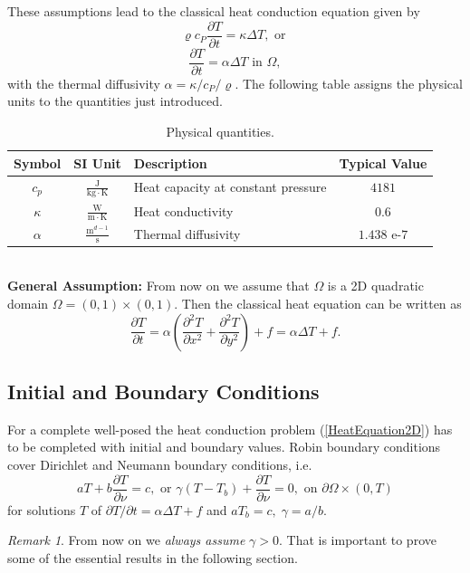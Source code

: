 \documentclass[a4paper,11pt]{article}
\theoremstyle{plain} %
\theoremstyle{definition} %
\theoremstyle{remark} %
\newtheorem{remark}{Remark}[section]
\theoremstyle{remark}
\def\Temp{T}
\def\Laplace{\Delta}
\begin{document}
These assumptions lead to the classical heat conduction equation given by
\begin{equation}
\varrho c_P \frac{\partial \Temp}{\partial t} = \kappa \Laplace \Temp , \text{ or }
\end{equation}
\begin{equation}
\frac{\partial T}{\partial t} = \alpha \Laplace \Temp \text{ in } \Omega ,
\end{equation}
with the thermal diffusivity $\alpha = \kappa / c_P / \varrho $. The following table assigns the physical units to the quantities just introduced.
\begin{table}[h!] 
\centering
{ \renewcommand{\arraystretch}{1.4}
\begin{tabular}{cclc}
\toprule
\textbf{Symbol} & \textbf{SI Unit} & \textbf{Description}& \textbf{Typical Value}\\
\midrule
$c_p$ & $\tfrac{\mathrm{J}}{\mathrm{kg}\cdot\mathrm{K} }$ & Heat capacity at constant pressure &  $ 4181 $\\
$\kappa $ & $\tfrac{\mathrm{W}}{\mathrm{m}\cdot\mathrm{K} }$ & Heat conductivity & $ 0.6 $\\
$\alpha $ & $\tfrac{\mathrm{m}^{d-1}}{\mathrm{s} }$ &  Thermal diffusivity & $ 1.438$ e-$7 $\\
\bottomrule
\end{tabular}}
\caption{Physical quantities.}
\label{TableTypicalValues}
\end{table}
\\
\textbf{General Assumption:} From now on we assume that $\Omega $ is a  2D quadratic domain $\Omega = (0,1)\times (0,1)$. Then the classical heat equation can be written as
\begin{equation} \label{HeatEquation2D}
\frac{\partial \Temp}{\partial t} = \alpha \left( \frac{\partial^2 \Temp}{\partial x^2} + \frac{\partial^2 \Temp}{\partial y^2} \right) + f = \alpha \Laplace \Temp + f .
\end{equation}

\subsection{Initial and Boundary Conditions}
For a complete well-posed the heat conduction problem (\ref{HeatEquation2D}) has to be completed with initial and boundary values. Robin boundary conditions cover Dirichlet and Neumann boundary conditions, i.e.
\begin{equation*}
a \Temp + b \frac{\partial \Temp}{\partial \nu } = c, \text{ or } \gamma (\Temp - \Temp_b ) + \frac{\partial \Temp}{\partial \nu } = 0, \text{ on }\partial \Omega \times (0,T)
\end{equation*}
for solutions $\Temp $ of $ \partial \Temp / \partial t = \alpha\Laplace \Temp +f $ and $a \Temp_b = c, \; \gamma = a/b $.
\begin{remark}
From now on we \emph{always assume} $ \gamma > 0 $. That is important to prove some of the essential results in the following section.
\end{remark}
\end{document}
